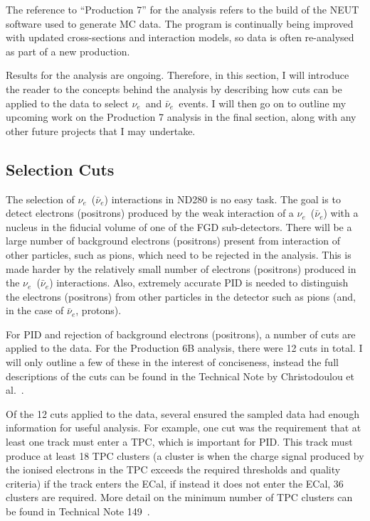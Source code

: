 \documentclass[aps,pra,12pt,notitlepage,tightenlines]{revtex4-1}
\newcommand{\nue}{$\nu_e$}
\newcommand{\anue}{$\bar\nu_e$}
\begin{document}
The reference to ``Production 7'' for the analysis refers to the build of the NEUT software used to generate MC data. The program is continually being improved with updated cross-sections and interaction models, so data is often re-analysed as part of a new production.

Results for the analysis are ongoing. Therefore, in this section, I will introduce the reader to the concepts behind the analysis by describing how cuts can be applied to the data to select \nue \ and \anue \ events. I will then go on to outline my upcoming work on the Production 7 analysis in the final section, along with any other future projects that I may undertake.

\subsection{Selection Cuts}
The selection of \nue \ (\anue) interactions in ND280 is no easy task. The goal is to detect electrons (positrons) produced by the weak interaction of a \nue \ (\anue) with a nucleus in the fiducial volume of one of the FGD sub-detectors. There will be a large number of background electrons (positrons) present from interaction of other particles, such as pions, which need to be rejected in the analysis. This is made harder by the relatively small number of electrons (positrons) produced in the \nue \ (\anue) interactions. Also, extremely accurate PID is needed to distinguish the electrons (positrons) from other particles in the detector such as pions (and, in the case of \anue , protons).

For PID and rejection of background electrons (positrons), a number of cuts are applied to the data. For the Production 6B analysis, there were 12 cuts in total. I will only outline a few of these in the interest of conciseness, instead the full descriptions of the cuts can be found in the Technical Note by Christodoulou et al.~\cite{Christodoulou2017}. 

Of the 12 cuts applied to the data, several ensured the sampled data had enough information for useful analysis. For example, one cut was the requirement that at least one track must enter a TPC, which is important for PID. This track must produce at least 18 TPC clusters (a cluster is when the charge signal produced by the ionised electrons in the TPC exceeds the required thresholds and quality criteria) if the track enters the ECal, if instead it does not enter the ECal, 36 clusters are required. More detail on the minimum number of TPC clusters can be found in Technical Note 149~\cite{Giganti2013}.
\end{document}
